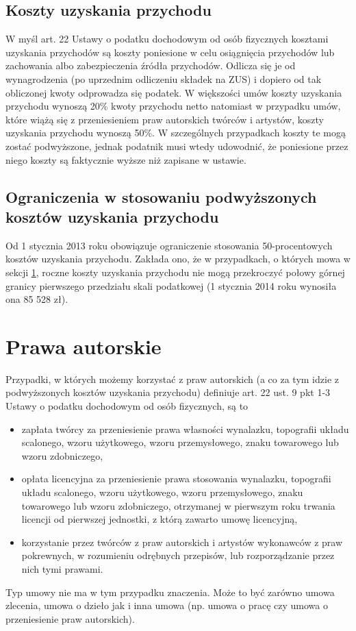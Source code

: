 \subsection[Koszty uzyskania przychodu][Koszty uzyskania przychodu]{Koszty uzyskania przychodu}
W myśl art. 22 Ustawy o podatku dochodowym od osób fizycznych\cite{ustawaOPodatkuDochodowym} kosztami uzyskania przychodów są koszty poniesione w celu osiągnięcia przychodów lub zachowania albo zabezpieczenia źródła przychodów. Odlicza się je od wynagrodzenia (po uprzednim odliczeniu składek na ZUS) i dopiero od tak obliczonej kwoty odprowadza się podatek. W większości umów koszty uzyskania przychodu wynoszą 20\% kwoty przychodu netto natomiast w przypadku umów, które wiążą się z przeniesieniem praw autorskich twórców i artystów, koszty uzyskania przychodu wynoszą 50\%. W szczególnych przypadkach koszty te mogą zostać podwyższone, jednak podatnik musi wtedy udowodnić, że poniesione przez niego koszty są faktycznie wyższe niż zapisane w ustawie.

\subsection[Ograniczenia w stosowaniu podwyższonych kosztów uzyskania przychodu][Ograniczenia w stosowaniu podwyższonych kosztów uzyskania przychodu]{Ograniczenia w stosowaniu podwyższonych kosztów uzyskania przychodu}
Od 1 stycznia 2013 roku obowiązuje ograniczenie stosowania 50-procentowych kosztów uzyskania przychodu. Zakłada ono, że  w przypadkach, o których mowa w sekcji \ref{prawaAutorskie}, roczne koszty uzyskania przychodu nie mogą przekroczyć połowy górnej granicy pierwszego przedziału skali podatkowej (1 stycznia 2014 roku wynosiła ona 85 528 zł).

\section[Prawa autorskie][Prawa autorskie]{Prawa autorskie}
\label{prawaAutorskie}
Przypadki, w których możemy korzystać z praw autorskich (a co za tym idzie z podwyższonych kosztów uzyskania przychodu) definiuje art. 22 ust. 9 pkt 1-3 Ustawy o podatku dochodowym od osób fizycznych\cite{ustawaOPodatkuDochodowym}, są to
\begin{itemize}
	\item  zapłata twórcy za przeniesienie prawa własności wynalazku, topografii układu scalonego, wzoru użytkowego, wzoru przemysłowego, znaku towarowego lub wzoru zdobniczego,
	\item opłata licencyjna za przeniesienie prawa stosowania wynalazku, topografii układu scalonego, wzoru użytkowego, wzoru przemysłowego, znaku towarowego lub wzoru zdobniczego, otrzymanej w pierwszym roku trwania licencji od pierwszej jednostki, z którą zawarto umowę licencyjną,
	\item korzystanie przez twórców z praw autorskich i artystów wykonawców z praw pokrewnych, w rozumieniu odrębnych przepisów, lub rozporządzanie przez nich tymi prawami.
\end{itemize}
Typ umowy nie ma w tym przypadku znaczenia. Może to być zarówno umowa zlecenia, umowa o dzieło jak i inna umowa (np. umowa o pracę czy umowa o przeniesienie praw autorskich).

